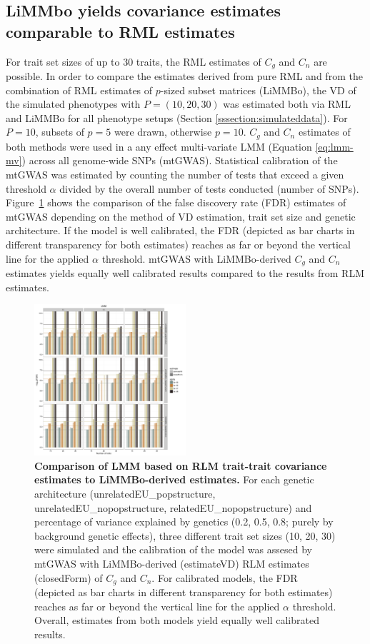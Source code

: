  \subsection{LiMMbo yields covariance estimates comparable to RML estimates}
For trait set sizes of up to 30 traits, the RML estimates of  $C_g$ and $C_n$ are possible. In order to compare the estimates derived from pure RML and from the combination of RML estimates of \(p\)-sized subset matrices (LiMMBo), the VD of the simulated phenotypes with \(P=(10,20,30)\) was estimated both via RML and LiMMBo for all phenotype setups (Section \ref{sssection:simulateddata}).  For \(P=10\), subsets of \(p=5\) were drawn, otherwise \(p=10\). $C_g$ and $C_n$ estimates of both methods were used in a any effect multi-variate LMM (Equation \ref{eq:lmm-mv}) across all genome-wide SNPs (mtGWAS). Statistical calibration of the mtGWAS was estimated by counting the number of tests that exceed a given threshold \(\alpha\) divided by the overall number of tests conducted (number of SNPs). Figure~\ref{fig:closedForm} shows the comparison of the false discovery rate (FDR) estimates of mtGWAS depending on the method of VD estimation, trait set size and genetic architecture. If the model is well calibrated, the FDR (depicted as bar charts in different transparency for both estimates) reaches as far or beyond the vertical line for the applied \(\alpha\) threshold. mtGWAS with LiMMBo-derived \(C_g\) and \(C_n\) estimates yields equally well calibrated results compared to the results from RLM estimates.

 \begin{figure}[hbtp]
	\centering
	\includegraphics[trim = 0mm 0mm 0mm 0mm, clip, width=0.5\textwidth]{Chapter1/Figures/20161205_calibrationBGOnly_closedForm.pdf}
	\caption{\textbf{Comparison of LMM based on RLM trait-trait covariance estimates to LiMMBo-derived estimates.}  For each genetic architecture (unrelatedEU\_popstructure, unrelatedEU\_nopopstructure, relatedEU\_nopopstructure) and percentage of variance explained by genetics (0.2, 0.5, 0.8; purely by background genetic effects), three different trait set sizes (10, 20, 30) were simulated and the calibration of the model was assesed by mtGWAS with LiMMBo-derived (estimateVD) RLM estimates (closedForm) of \(C_g\) and \(C_n\). For calibrated models, the FDR (depicted as bar charts in different transparency for both estimates) reaches as far or beyond the vertical line for the applied \(\alpha\) threshold. Overall, estimates from both models yield equally well calibrated results.}
 	\label{fig:closedForm}
\end{figure}

